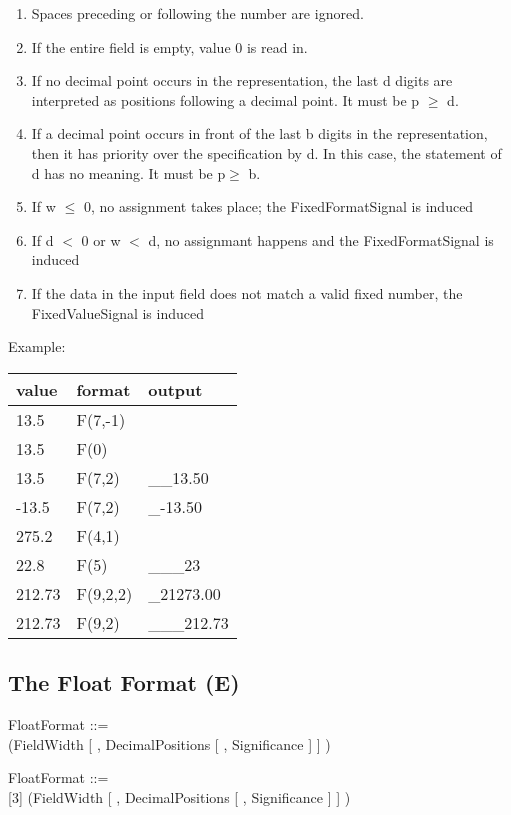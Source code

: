 \begin{added}
\begin{enumerate}
\begin{enumerate}
\item Spaces preceding or following the number are ignored.
\item If the entire field is empty, value 0 is read in.
\item If no decimal point occurs in the representation, the last d
digits are interpreted as positions following a decimal point. It must
be p $\geq$ d.
\item If a decimal point occurs in front of the last b digits in the
representation, then it has priority over the specification by d. In
this case, the statement of d has no meaning. It must be p$\geq$ b.
\item If w $\leq$ 0, no assignment takes place;
    the FixedFormatSignal is induced
\item If d $<$ 0 or w $<$ d, no assignmant happens and 
    the FixedFormatSignal is induced
\item If the data in the input field does not match a valid fixed 
   number, the FixedValueSignal is induced
\end{enumerate}
\end{enumerate}

Example:

\begin{tabular}{lll}
value  & format   & output \\ \hline
13.5   & F(7,-1)   &  \x \x {\em FixedFormatSignal!}  \\
13.5   & F(0)   &  \x \x {\em FixedFormatSignal!}  \\
13.5   & F(7,2)   & \_\_13.50  \\
-13.5   & F(7,2)   & \_-13.50  \\
275.2  & F(4,1)   &  \x \x {\em FixedValueSignal!} \\
22.8   & F(5)     & \_\_\_23 \\
212.73 & F(9,2,2) & \_21273.00 \\
212.73 & F(9,2)   & \_\_\_212.73
\end{tabular}
\end{added}

\subsection{The Float Format (E)}   %
\label{sec_dation_e_format}

\begin{removed}
FloatFormat ::=\\
 (FieldWidth [ , DecimalPositions [ , Significance ] ] )
\end{removed}
\begin{added}
FloatFormat ::=\\
[3] (FieldWidth [ , DecimalPositions [ , Significance ] ] )
\end{added}

